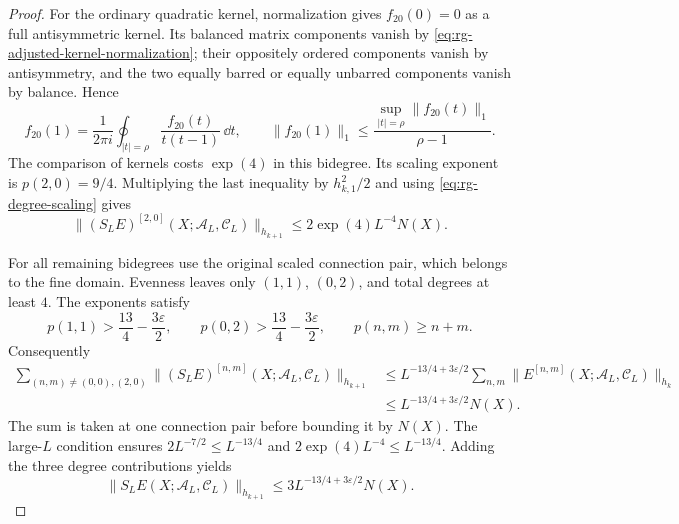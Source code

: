 \begin{proof}
For the ordinary quadratic kernel, normalization gives
$f_{20}(0)=0$ as a full antisymmetric kernel. Its balanced
matrix components vanish by
\eqref{eq:rg-adjusted-kernel-normalization}; their
oppositely ordered components vanish by antisymmetry,
and the two equally barred or equally unbarred components
vanish by balance. Hence
\[
 f_{20}(1)=\frac1{2\pi i}\oint_{|t|=\rho}
                                    \frac{f_{20}(t)}{t(t-1)}\,\dd t,
 \qquad
 \|f_{20}(1)\|_1\le\frac{\sup_{|t|=\rho}\|f_{20}(t)\|_1}{\rho-1}.
\]
The comparison of kernels costs $\exp(4)$ in this
bidegree. Its scaling exponent is $p(2,0)=9/4$.
Multiplying the last inequality by $h_{k,1}^2/2$ and
using \eqref{eq:rg-degree-scaling} gives
\begin{equation}\label{eq:rg-quadratic-cauchy-gain}
 \|(S_LE)^{[2,0]}(X;\mathscr A_L,\mathscr C_L)\|_{h_{k+1}}
                       \le2\exp(4)L^{-4}N(X).
\end{equation}

For all remaining bidegrees use the original scaled
connection pair, which belongs to the fine domain.
Evenness leaves only $(1,1)$, $(0,2)$, and total degrees
at least $4$. The exponents satisfy
\[
 p(1,1)>\frac{13}{4}-\frac{3\varepsilon}{2},\qquad
 p(0,2)>\frac{13}{4}-\frac{3\varepsilon}{2},\qquad
 p(n,m)\ge n+m.
\]
Consequently
\[
 \begin{split}
 \sum_{(n,m)\ne(0,0),(2,0)}
       \|(S_LE)^{[n,m]}(X;\mathscr A_L,\mathscr C_L)\|_{h_{k+1}}
 &\le L^{-13/4+3\varepsilon/2}
       \sum_{n,m}\|E^{[n,m]}(X;\mathscr A_L,\mathscr C_L)\|_{h_k}\\
 &\le L^{-13/4+3\varepsilon/2}N(X).
 \end{split}
\]
The sum is taken at one connection pair before bounding
it by $N(X)$. The large-$L$ condition ensures
$2L^{-7/2}\le L^{-13/4}$ and
$2\exp(4)L^{-4}\le L^{-13/4}$. Adding the three
degree contributions yields
\begin{equation}\label{eq:rg-small-polymer-contraction}
 \|S_LE(X;\mathscr A_L,\mathscr C_L)\|_{h_{k+1}}
                       \le3L^{-13/4+3\varepsilon/2}N(X).
\end{equation}


\end{proof}
